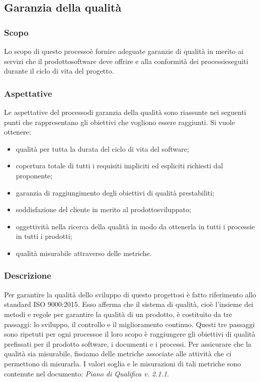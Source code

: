 \subsection{Garanzia della qualità}
\subsubsection{Scopo}
Lo scopo di questo processo\glosp è fornire adeguate garanzie di qualità in merito ai servizi che il prodotto\glosp software deve offrire e alla conformità dei processi\glosp eseguiti durante il ciclo di vita del progetto\glo.
\subsubsection{Aspettative}
Le aspettative del processo\glo di garanzia della qualità sono riassunte nei seguenti punti che rappresentano gli obiettivi che vogliono essere raggiunti. Si vuole ottenere:
\begin{itemize}
	\item qualità per tutta la durata del ciclo di vita del software;
	\item copertura totale di tutti i requisiti impliciti ed espliciti richiesti dal proponente;
	\item garanzia di raggiungimento degli obiettivi di qualità prestabiliti;
	\item soddisfazione del cliente in merito al prodotto\glosp sviluppato;
	\item oggettività nella ricerca della qualità in modo da ottenerla in tutti i processi\glosp e in tutti i prodotti\glo;
	\item qualità misurabile attraverso delle metriche.
\end{itemize}
\subsubsection{Descrizione}
Per garantire la qualità dello sviluppo di questo progetto\glosp si è fatto riferimento allo standard ISO 9000:2015. Esso afferma che il sistema di qualità, cioè l'insieme dei metodi e regole per garantire la qualità di un prodotto\glo, è costituito da tre passaggi: lo sviluppo, il controllo e il miglioramento continuo. Questi tre passaggi sono ripetuti per ogni processo\glosp e il loro scopo è raggiungere gli obiettivi di qualità prefissati per il prodotto software, i documenti e i processi.
Per assicurare che la qualità sia misurabile, fissiamo delle metriche associate alle attività che ci permettono di misurarla. I valori soglia e le misurazioni di tali metriche sono contenute nel documento: \textit{Piano di Qualifica v. 2.1.1}.
